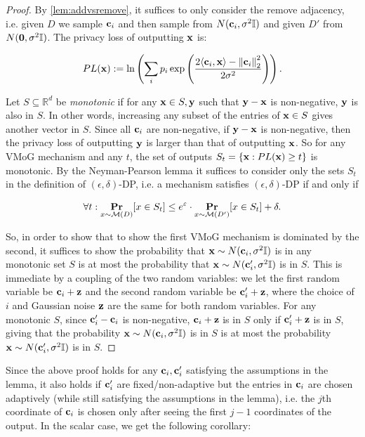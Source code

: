 \begin{proof}

By \cref{lem:addvsremove}, it suffices to only consider the remove adjacency, i.e. given $D$ we sample $\mathbf{c}_i$ and then sample from $N(\mathbf{c}_i, \sigma^2 \mathbb{I})$ and given $D'$ from $N(\boldsymbol{0}, \sigma^2 \mathbb{I})$. The privacy loss of outputting $\mathbf{x}$ is:

\[PL(\mathbf{x}) := \ln\left(\sum_i p_i \exp\left(\frac{2 \langle \mathbf{c}_i, \mathbf{x} \rangle - \left\|\mathbf{c}_i\right\|_2^2}{2\sigma^2}\right)\right).\]

Let $S \subseteq \mathbb{R}^d$ be \textit{monotonic} if for any $\mathbf{x} \in S, \mathbf{y}$ such that $\mathbf{y} - \mathbf{x}$ is non-negative, $\mathbf{y}$ is also in $S$. In other words, increasing any subset of the entries of $\mathbf{x} \in S$ gives another vector in $S$. 
Since all $\mathbf{c}_i$ are non-negative, if $\mathbf{y} - \mathbf{x}$ is non-negative, then the privacy loss of outputting $\mathbf{y}$ is larger than that of outputting $\mathbf{x}$.
So for any VMoG mechanism and any $t$, the set of outputs $S_t = \{\mathbf{x}: PL(\mathbf{x}) \geq t\}$ is monotonic. By the Neyman-Pearson lemma it suffices to consider only the sets $S_t$ in the definition of $(\epsilon, \delta)$-DP, i.e. a mechanism satisfies $(\epsilon, \delta)$-DP if and only if 

\[\forall t: \mathop{\mathbf{Pr}}_{x \sim \mathcal{M}(D)}[x \in S_t] \leq e^\varepsilon \cdot \mathop{\mathbf{Pr}}_{x \sim \mathcal{M}(D')}[x \in S_t] + \delta.\]

So, in order to show that to show the first VMoG mechanism is dominated by the second, it suffices to show the probability that $\mathbf{x} \sim N(\mathbf{c}_i, \sigma^2 \mathbb{I})$ is in any monotonic set $S$ is at most the probability that $\mathbf{x} \sim N(\mathbf{c}'_i, \sigma^2 \mathbb{I})$ is in $S$. This is immediate by a coupling of the two random variables: we let the first random variable be $\mathbf{c}_i + \mathbf{z}$ and the second random variable be $\mathbf{c}'_i + \mathbf{z}$, where the choice of $i$ and Gaussian noise $\mathbf{z}$ are the same for both random variables. For any monotonic $S$, since $\mathbf{c}'_i - \mathbf{c}_i$ is non-negative, $\mathbf{c}_i + \mathbf{z}$ is in $S$ only if $\mathbf{c}'_i + \mathbf{z}$ is in $S$, giving that the probability $\mathbf{x} \sim N(\mathbf{c}_i, \sigma^2 \mathbb{I})$ is in $S$ is at most the probability $\mathbf{x} \sim N(\mathbf{c}'_i, \sigma^2 \mathbb{I})$ is in $S$.
\end{proof}

Since the above proof holds for any $\mathbf{c}_i, \mathbf{c}_i'$ satisfying the assumptions in the lemma, it also holds if $\mathbf{c}_i'$ are fixed/non-adaptive but the entries in $\mathbf{c}_i$ are chosen adaptively (while still satisfying the assumptions in the lemma), i.e. the $j$th coordinate of $\mathbf{c}_i$ is chosen only after seeing the first $j-1$ coordinates of the output. In the scalar case, we get the following corollary:

